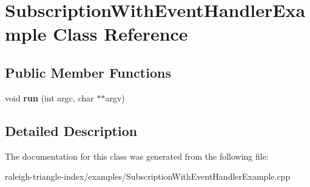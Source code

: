\section{Subscription\+With\+Event\+Handler\+Example Class Reference}
\label{class_subscription_with_event_handler_example}
\subsection*{Public Member Functions}
\begin{DoxyCompactItemize}
\item 
void {\bfseries run} (int argc, char $\ast$$\ast$argv)\label{class_subscription_with_event_handler_example_a4ad0728f9c4e635299021685c751510e}

\end{DoxyCompactItemize}


\subsection{Detailed Description}


The documentation for this class was generated from the following file\+:\begin{DoxyCompactItemize}
\item 
raleigh-\/triangle-\/index/examples/Subscription\+With\+Event\+Handler\+Example.\+cpp\end{DoxyCompactItemize}
